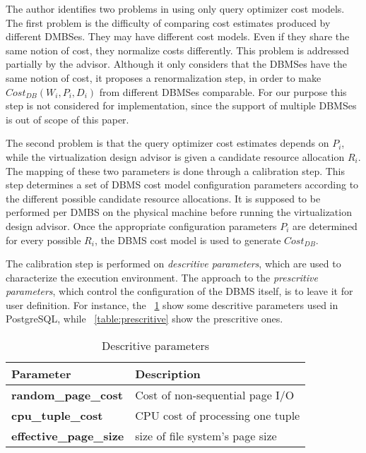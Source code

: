 The author identifies two problems in using only query optimizer cost models. The first problem is the difficulty of comparing cost estimates produced by different DMBSes. They may have different cost models. Even if they share the same notion of cost, they normalize costs differently. This problem is addressed partially by the advisor. Although it only considers that the DBMSes have the same notion of cost, it proposes a renormalization step, in order to make $Cost_{DB}(W_{i},P_{i},D_{i})$ from different DBMSes comparable. For our purpose this step is not considered for implementation, since the support of multiple DBMSes is out of scope of this paper.

The second problem is that the query optimizer cost estimates depends on $P_{i}$, while the virtualization design advisor is given a candidate resource allocation $R_{i}$. The mapping of these two parameters is done through a calibration step. This step determines a set of DBMS cost model configuration parameters according to the different possible candidate resource allocations. It is supposed to be performed per DMBS on the physical machine before running the virtualization design advisor. Once the appropriate configuration parameters $P_{i}$ are determined for every possible $R_{i}$, the DBMS cost model is used to generate $Cost_{DB}$.

The calibration step is performed on  \textit{descritive parameters}, which are used to characterize the execution environment. The approach to the \textit{prescritive parameters}, which control the configuration of the DBMS itself, is to leave it for user definition. For instance, the ~\ref{table:descritive}  show some descritive parameters used in PostgreSQL, while ~\ref{table:prescritive}  show the prescritive ones. 


\begin{table}[ht]
    \centering
    \begin{tabular}{ | l | p{5cm} |}
    \hline
    Parameter & Description  \\ \hline
    \textbf{random\_page\_cost} & Cost of non-sequential page I/O \\ \hline
    \textbf{cpu\_tuple\_cost} & CPU cost of processing one tuple \\ \hline
    \textbf{effective\_page\_size} & size of file system's page size  \\
    \hline
    \end{tabular}
    \caption{Descritive parameters}
    \label{table:descritive}
\end{table}


